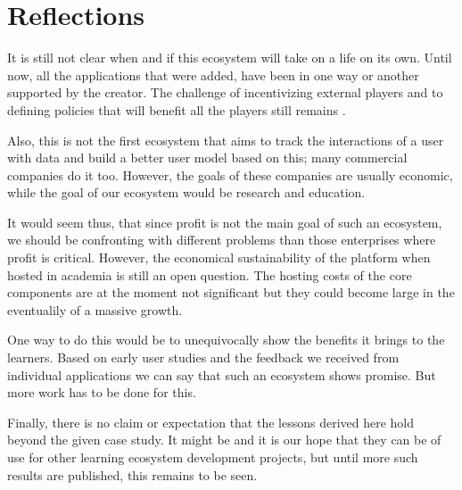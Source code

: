 
\section {Reflections}

It is still not clear when and if this ecosystem will 
take on a life on its own. Until now, all the 
applications that were added, have been in one way
or another supported by the creator. The challenge
of incentivizing external players and
to defining policies that will benefit all the 
players still remains \cite{Jans09agenda}.


Also, this is not the first ecosystem that aims to track 
the interactions of a user with data and build a better 
user model based on this; many commercial companies do it too. 
However, the goals of these companies are usually economic, 
while the goal of our ecosystem would be research and education.

It would seem thus, that since profit is not the main
goal of such an ecosystem, we should be confronting
with different problems than those enterprises where 
profit is critical. However, the economical 
sustainability of the platform when hosted in academia
is still an open question. The hosting costs of the 
core components are at the moment not significant 
but they could become large in the eventualily of 
a massive growth.


One way to do this would be to unequivocally show 
the benefits it brings to the learners. Based on 
early user studies and the feedback we received 
from individual applications we can say that such
an ecosystem shows promise. But more work has to 
be done for this. 


Finally, there is no claim or expectation that the 
lessons derived here hold beyond the given case study. It 
might be and it is our hope that they can be of 
use for other learning ecosystem development
projects, but until more such results 
are published, this remains to be seen.





